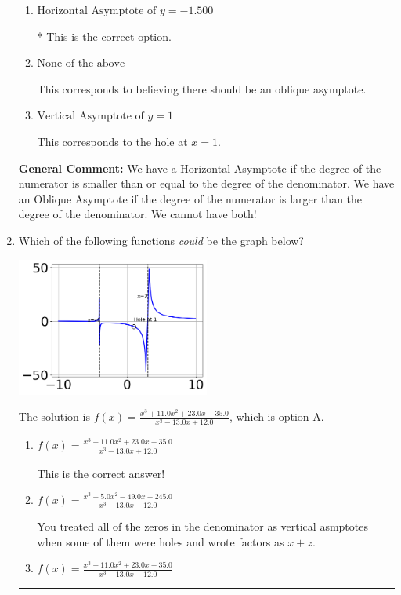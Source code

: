 \documentclass{extbook}[14pt]
\newcommand{\litem}[1]{\item #1

\rule{\textwidth}{0.4pt}}
\begin{document}
\begin{enumerate}
{\begin{enumerate}[label=\Alph*.]
This corresponds to using the rule for Horizontal Asymptote when the degree of the denominator is larger than the numerator.
\item \( \text{Horizontal Asymptote of } y = -1.500  \)

* This is the correct option.
\item \( \text{None of the above} \)

This corresponds to believing there should be an oblique asymptote.
\item \( \text{Vertical Asymptote of } y = 1  \)

This corresponds to the hole at $x = 1$.
\end{enumerate}

\textbf{General Comment:} We have a Horizontal Asymptote if the degree of the numerator is smaller than or equal to the degree of the denominator. We have an Oblique Asymptote if the degree of the numerator is larger than the degree of the denominator. We cannot have both!
}
\litem{
Which of the following functions \textit{could} be the graph below?

\begin{center}
    \includegraphics[width=0.5\textwidth]{../Figures/identifyGraphOfRationalFunctionB.png}
\end{center}


The solution is \( f(x)=\frac{x^{3} +11.0 x^{2} +23.0 x -35.0}{x^{3} -13.0 x + 12.0} \), which is option A.\begin{enumerate}[label=\Alph*.]
\item \( f(x)=\frac{x^{3} +11.0 x^{2} +23.0 x -35.0}{x^{3} -13.0 x + 12.0} \)

This is the correct answer!
\item \( f(x)=\frac{x^{3} -5.0 x^{2} -49.0 x + 245.0}{x^{3} -13.0 x -12.0} \)

You treated all of the zeros in the denominator as vertical asmptotes when some of them were holes and wrote factors as $x+z$.
\item \( f(x)=\frac{x^{3} -11.0 x^{2} +23.0 x + 35.0}{x^{3} -13.0 x -12.0} \)


\end{enumerate}}
\end{enumerate}
\end{document}
